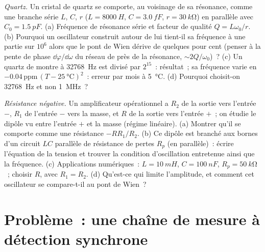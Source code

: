 \begin{exercise}[$\star\star\star$]\label{exo:b2:feedback-oscillators:11}
\emph{Quartz.} Un cristal de quartz se comporte, au voisinage de sa résonance, comme une
branche série $L$, $C$, $r$ ($L = \qty{8000}{H}$, $C = \qty{3.0}{fF}$, $r =
\qty{30}{k\ohm}$) en parallèle avec $C_0 = \qty{1.5}{pF}$. (a) Fréquence de résonance
série et facteur de qualité $Q = L\omega_0/r$. (b) Pourquoi un oscillateur
construit autour de lui tient-il sa fréquence à une partie sur $10^6$ alors que le pont de
Wien dérive de quelques pour cent (penser à la pente de phase $\dd\varphi/\dd\omega$ du
réseau de  près de la résonance, $\sim 2Q/\omega_0$)~? (c) Un quartz de
montre à \qty{32768}{Hz} est divisé par $2^{15}$~: résultat~; sa fréquence
varie en $-0.04\,\text{ppm}\,(T - \qty{25}{\degreeCelsius})^2$~: erreur par
mois à \qty{5}{\degreeCelsius}. (d) Pourquoi choisit-on \qty{32768}{Hz} et non
\qty{1}{MHz}~?
\end{exercise}

\begin{exercise}[$\star\star\star$]\label{exo:b2:feedback-oscillators:12}
\emph{Résistance négative.} Un amplificateur opérationnel a $R_2$ de la sortie vers l'entrée
$-$, $R_1$ de l'entrée $-$ vers la masse, et $R$ de la sortie vers l'entrée $+$~;
on étudie le dipôle vu entre l'entrée $+$ et la masse (régime
linéaire). (a) Montrer qu'il se comporte comme une résistance $-RR_1/R_2$. (b) Ce
dipôle est branché aux bornes d'un circuit $LC$ parallèle de résistance de pertes
$R_p$ (en parallèle)~: écrire l'équation de la tension et trouver la
condition d'oscillation entretenue ainsi que la fréquence. (c) Applications numériques~: $L
= \qty{10}{mH}$, $C = \qty{100}{nF}$, $R_p = \qty{50}{k\ohm}$~; choisir $R$, avec $R_1 =
R_2$. (d) Qu'est-ce qui limite l'amplitude, et comment cet oscillateur
se compare-t-il au pont de Wien~?
\end{exercise}

\section{Problème~: une chaîne de mesure à détection synchrone}

